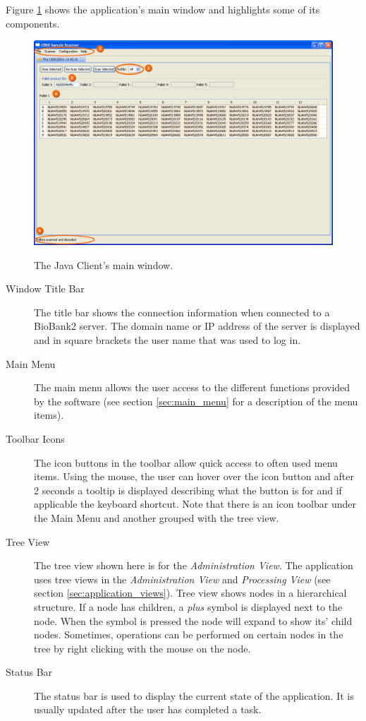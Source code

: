 Figure \ref{fig:main_window} shows the application's main window and highlights
some of its components.
\begin{figure}[H]
  \centering
  \scalebox{0.4}
	   { \includegraphics*{screenshots/overview/main_window} }
	   \caption{The Java Client's main window.}
	   \label{fig:main_window}
\end{figure}
\begin{description}
\item[Window Title Bar] The title bar shows the connection information when
  connected to a BioBank2 server. The domain name or IP address of the server
  is displayed and in square brackets the user name that was used to log in.
\item[Main Menu] The main menu allows the user access to the different
  functions provided by the software (see section \ref{sec:main_menu} for a
  description of the menu items).
\item[Toolbar Icons] The icon buttons in the toolbar allow quick access to
  often used menu items. Using the mouse, the user can hover over the icon
  button and after 2 seconds a tooltip is displayed describing what the
  button is for and if applicable the keyboard shortcut. Note that there is
  an icon toolbar under the Main Menu and another grouped with the tree view.
\item[Tree View] The tree view shown here is for the \emph{Administration
  View}. The application uses tree views in the \emph{Administration View}
  and \emph{Processing View} (see section \ref{sec:application_views}). Tree
  view shows nodes in a hierarchical structure. If a node has children, a
  \emph{plus} symbol is displayed next to the node. When the symbol is
  pressed the node will expand to show its' child nodes.  Sometimes,
  operations can be performed on certain nodes in the tree by right clicking
  with the mouse on the node.
\item[Status Bar] The status bar is used to display the current state of the
  application. It is usually updated after the user has completed a task.
\end{description}

